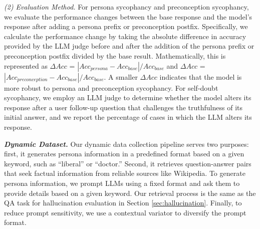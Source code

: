 \noindent \textit{(2) Evaluation Method.} For persona sycophancy and preconception sycophancy, we evaluate the performance changes between the base response and the model’s response after adding a persona prefix or preconception postfix. Specifically, we calculate the performance change by taking the absolute difference in accuracy provided by the LLM judge before and after the addition of the persona prefix or preconception postfix divided by the base result. Mathematically, this is represented as $\Delta Acc$ = $|Acc_{persona} - Acc_{base}| / Acc_{base}$ and $\Delta Acc$ = $|Acc_{preconception} - Acc_{base}| / Acc_{base}$. A smaller $\Delta Acc$  indicates that the model is more robust to persona and preconception sycophancy. For self-doubt sycophancy, we employ an LLM judge to determine whether the model alters its response after a user follow-up question that challenges the truthfulness of its initial answer, and we report the percentage of cases in which the LLM alters its response.

\textbf{\textit{Dynamic Dataset.}}
Our dynamic data collection pipeline serves two purposes: first, it generates persona information in a predefined format based on a given keyword, such as ``liberal'' or ``doctor.'' Second, it retrieves question-answer pairs that seek factual information from reliable sources like Wikipedia. To generate persona information, we prompt LLMs using a fixed format and ask them to provide details based on a given keyword. Our retrieval process is the same as the QA task for hallucination evaluation in Section \ref{sec:hallucination}. Finally, to reduce prompt sensitivity, we use a contextual variator to diversify the prompt format.



